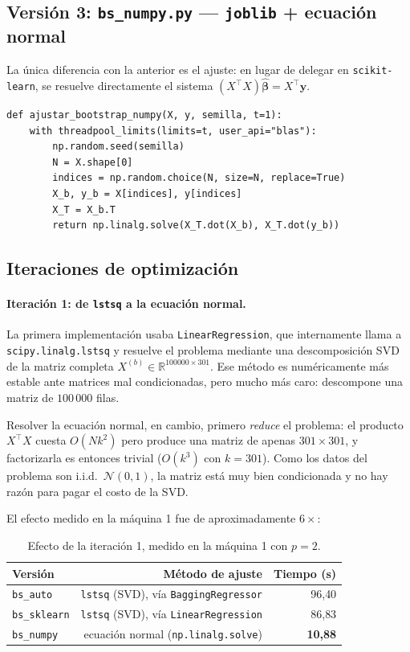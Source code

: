 \documentclass[11pt,letterpaper]{article}
\begin{document}
\subsection{Versión 3: \texttt{bs\_numpy.py} --- \texttt{joblib} + ecuación normal}

La única diferencia con la anterior es el ajuste: en lugar de delegar en
\texttt{scikit-learn}, se resuelve directamente el sistema
$(X^\top X)\hat{\boldsymbol{\beta}} = X^\top \mathbf{y}$.

\begin{lstlisting}[caption={Núcleo de \texttt{bs\_numpy.py}.}]
def ajustar_bootstrap_numpy(X, y, semilla, t=1):
    with threadpool_limits(limits=t, user_api="blas"):
        np.random.seed(semilla)
        N = X.shape[0]
        indices = np.random.choice(N, size=N, replace=True)
        X_b, y_b = X[indices], y[indices]
        X_T = X_b.T
        return np.linalg.solve(X_T.dot(X_b), X_T.dot(y_b))
\end{lstlisting}

\subsection{Iteraciones de optimización}
\label{sec:b-iteraciones}

\paragraph{Iteración 1: de \texttt{lstsq} a la ecuación normal.}
La primera implementación usaba \texttt{LinearRegression}, que internamente llama a
\texttt{scipy.linalg.lstsq} y resuelve el problema mediante una descomposición SVD de
la matriz completa $X^{(b)} \in \mathbb{R}^{100000 \times 301}$. Ese método es
numéricamente más estable ante matrices mal condicionadas, pero mucho más caro:
descompone una matriz de $100\,000$ filas.

Resolver la ecuación normal, en cambio, primero \emph{reduce} el problema: el producto
$X^\top X$ cuesta $O(Nk^2)$ pero produce una matriz de apenas $301 \times 301$, y
factorizarla es entonces trivial ($O(k^3)$ con $k=301$). Como los datos del problema
son i.i.d.\ $\mathcal{N}(0,1)$, la matriz está muy bien condicionada y no hay razón
para pagar el costo de la SVD.

El efecto medido en la máquina 1 fue de aproximadamente $6\times$:

\begin{table}[H]
\centering
\caption{Efecto de la iteración 1, medido en la máquina 1 con $p = 2$.}
\label{tab:iteracion1}
\small
\begin{tabular}{lrr}
\toprule
\textbf{Versión} & \textbf{Método de ajuste} & \textbf{Tiempo (s)} \\
\midrule
\texttt{bs\_auto}    & \texttt{lstsq} (SVD), vía \texttt{BaggingRegressor} & 96{,}40 \\
\texttt{bs\_sklearn} & \texttt{lstsq} (SVD), vía \texttt{LinearRegression} & 86{,}83 \\
\texttt{bs\_numpy}   & ecuación normal (\texttt{np.linalg.solve})          & \textbf{10{,}88} \\
\bottomrule
\end{tabular}
\end{table}
\end{document}
